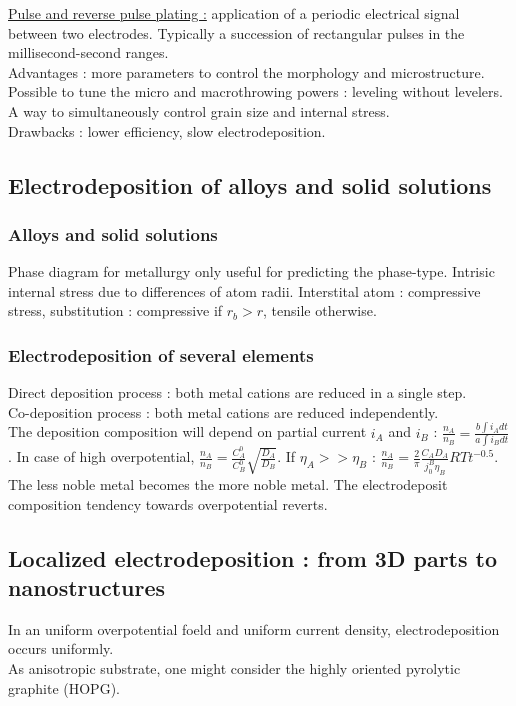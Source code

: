 \documentclass[../main.tex]{subfiles}
\begin{document}
\quad \underline{Pulse and reverse pulse plating :} application of a periodic electrical signal between two electrodes. Typically a succession of rectangular pulses in the millisecond-second ranges.\\
Advantages : more parameters to control the morphology and microstructure. Possible to tune the micro and macrothrowing powers : leveling without levelers. A way to simultaneously control grain size and internal stress. \\
Drawbacks : lower efficiency, slow electrodeposition.\\

\subsection{Electrodeposition of alloys and solid solutions}
\subsubsection{Alloys and solid solutions}
Phase diagram for metallurgy only useful for predicting the phase-type. Intrisic internal stress due to differences of atom radii. Interstital atom : compressive stress, substitution : compressive if $r_b>r$, tensile otherwise.\\

\subsubsection{Electrodeposition of several elements}
Direct deposition process : both metal cations are reduced in a single step. \\
Co-deposition process : both metal cations are reduced independently. \\
The deposition composition will depend on partial current $i_A$ and $i_B$ : $\frac{n_A}{n_B} = \frac{b \int i_A dt}{a \int i_B dt}$. In case of high overpotential, $\frac{n_A}{n_B} = \frac{C_A^0}{C_B^0} \sqrt{\frac{D_A}{D_B}}$. If $\eta_A>>\eta_B$ : $\frac{n_A}{n_B} = \frac{2}{\pi} \frac{C_A D_A}{j_0^B \eta_B} RT t^{-0.5}$.\\
The less noble metal becomes the more noble metal. The electrodeposit composition tendency towards overpotential reverts. \\

\subsection{Localized electrodeposition : from 3D parts to nanostructures}
In an uniform overpotential foeld and uniform current density, electrodeposition occurs uniformly. \\
As anisotropic substrate, one might consider the highly oriented pyrolytic graphite (HOPG). \\
\end{document}
